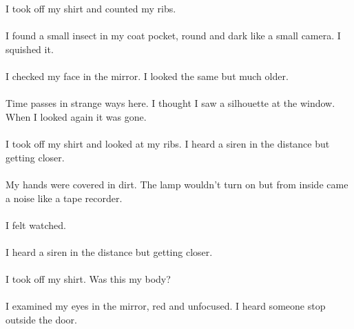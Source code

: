 \documentclass{article}
\begin{document}
    \section{}
    I took off my shirt and counted my ribs. \\\\I found a small insect in my coat pocket, round and dark like a small camera. I squished it. \\\\I checked my face in the mirror. I looked the same but much older. \\\\Time passes in strange ways here. I thought I saw a silhouette at the window. When I looked again it was gone. \\\\I took off my shirt and looked at my ribs. I heard a siren in the distance but getting closer. \\\\My hands were covered in dirt. The lamp wouldn't turn on but from inside came a noise like a tape recorder. \\\\I felt watched. \\\\I heard a siren in the distance but getting closer. \\\\I took off my shirt. Was this my body? \\\\I examined my eyes in the mirror, red and unfocused. I heard someone stop outside the door. \\\\
    \newpage
    
\end{document}
